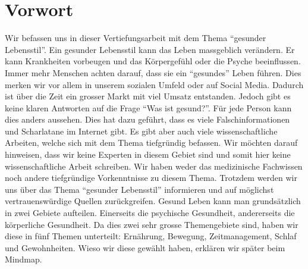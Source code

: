 \chapter{Vorwort}
\authortoc{\dario}{\chapterident}
Wir befassen uns in dieser Vertiefungsarbeit mit dem Thema “gesunder Lebensstil”. Ein gesunder Lebensstil kann das Leben massgeblich verändern. Er kann Krankheiten vorbeugen und das Körpergefühl oder die Psyche beeinflussen.
\newline
Immer mehr Menschen achten darauf, dass sie ein “gesundes” Leben führen. Dies merken wir vor allem in unserem sozialen Umfeld oder auf Social Media. Dadurch ist über die Zeit ein grosser Markt mit viel Umsatz entstanden. Jedoch gibt es keine klaren Antworten auf die Frage “Was ist gesund?”. Für jede Person kann dies anders aussehen. Dies hat dazu geführt, dass es viele Falschinformationen und Scharlatane im Internet gibt. Es gibt aber auch viele wissenschaftliche Arbeiten, welche sich mit dem Thema tiefgründig befassen.
\newline
Wir möchten darauf hinweisen, dass wir keine Experten in diesem Gebiet sind und somit hier keine wissenschaftliche Arbeit schreiben. Wir haben weder das medizinische Fachwissen noch andere tiefgründige Vorkenntnisse zu diesem Thema. Trotzdem werden wir uns über das Thema “gesunder Lebensstil” informieren und auf möglichst vertrauenswürdige Quellen zurückgreifen.
\newline
Gesund Leben kann man grundsätzlich in zwei Gebiete aufteilen. Einerseits die psychische Gesundheit, andererseits die körperliche Gesundheit. Da dies zwei sehr grosse Themengebiete sind, haben wir diese in fünf Themen unterteilt: Ernährung, Bewegung, Zeitmanagement, Schlaf und Gewohnheiten. Wieso wir diese gewählt haben, erklären wir später beim Mindmap.